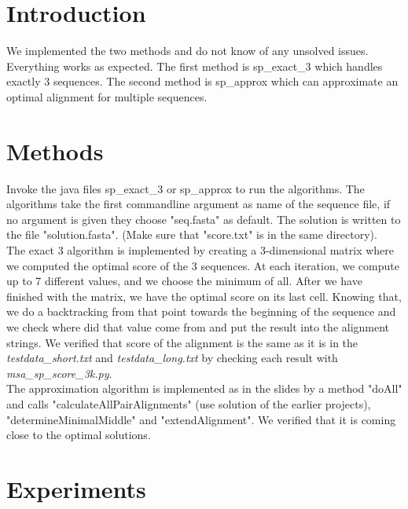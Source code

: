 \documentclass[12pt,a4paper]{article}
\begin{document}
	\section{Introduction}
	We implemented the two methods and do not know of any unsolved issues. Everything works as expected. The first method is sp\_exact\_3 which handles exactly 3 sequences. The second method is sp\_approx which can approximate an optimal alignment for multiple sequences.

	\section{Methods}
	Invoke the java files sp\_exact\_3 or sp\_approx to run the algorithms. The algorithms take the first commandline argument as name of the sequence file, if no argument is given they choose "seq.fasta" as default. The solution is written to the file "solution.fasta". (Make sure that "score.txt" is in the same directory).
	\\
	The exact 3 algorithm is implemented by creating a 3-dimensional matrix where we computed the optimal score of the 3 sequences. At each iteration, we compute up to 7 different values, and we choose the minimum of all. After we have finished with the matrix, we have the optimal score on its last cell. Knowing that, we do a backtracking from that point towards the beginning of the sequence and we check where did that value come from and put the result into the alignment strings. We verified that score of the alignment is the same as it is in the \textit{testdata\_short.txt} and \textit{testdata\_long.txt} by checking each result with \textit{msa\_sp\_score\_3k.py}.
	\\
	The approximation algorithm is implemented as in the slides by a method "doAll" and calls "calculateAllPairAlignments" (use solution of the earlier projects), "determineMinimalMiddle" and "extendAlignment". We verified that it is coming close to the optimal solutions.

	\section{Experiments}
\end{document}
